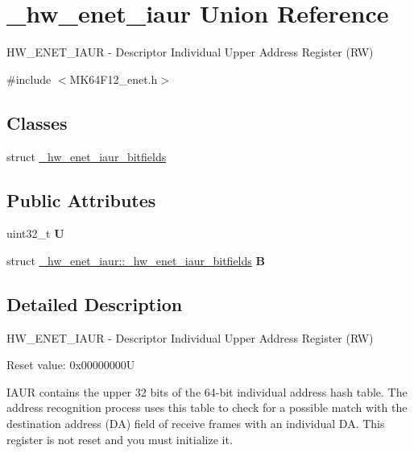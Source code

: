 \hypertarget{union__hw__enet__iaur}{}\section{\+\_\+hw\+\_\+enet\+\_\+iaur Union Reference}
\label{union__hw__enet__iaur}


H\+W\+\_\+\+E\+N\+E\+T\+\_\+\+I\+A\+UR -\/ Descriptor Individual Upper Address Register (RW)  




{\ttfamily \#include $<$M\+K64\+F12\+\_\+enet.\+h$>$}

\subsection*{Classes}
\begin{DoxyCompactItemize}
\item 
struct \hyperlink{struct__hw__enet__iaur_1_1__hw__enet__iaur__bitfields}{\+\_\+hw\+\_\+enet\+\_\+iaur\+\_\+bitfields}
\end{DoxyCompactItemize}
\subsection*{Public Attributes}
\begin{DoxyCompactItemize}
\item 
uint32\+\_\+t {\bfseries U}\hypertarget{union__hw__enet__iaur_a1dbcecb612aec0b61d43e5f2082afae4}{}\label{union__hw__enet__iaur_a1dbcecb612aec0b61d43e5f2082afae4}

\item 
struct \hyperlink{struct__hw__enet__iaur_1_1__hw__enet__iaur__bitfields}{\+\_\+hw\+\_\+enet\+\_\+iaur\+::\+\_\+hw\+\_\+enet\+\_\+iaur\+\_\+bitfields} {\bfseries B}\hypertarget{union__hw__enet__iaur_a946d6b34010032031c0178a2ea7392c2}{}\label{union__hw__enet__iaur_a946d6b34010032031c0178a2ea7392c2}

\end{DoxyCompactItemize}


\subsection{Detailed Description}
H\+W\+\_\+\+E\+N\+E\+T\+\_\+\+I\+A\+UR -\/ Descriptor Individual Upper Address Register (RW) 

Reset value\+: 0x00000000U

I\+A\+UR contains the upper 32 bits of the 64-\/bit individual address hash table. The address recognition process uses this table to check for a possible match with the destination address (DA) field of receive frames with an individual DA. This register is not reset and you must initialize it. 

